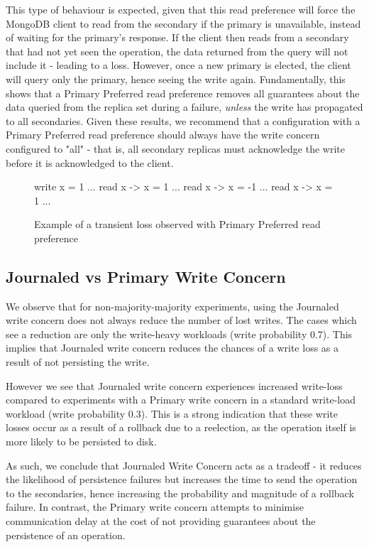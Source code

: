 This type of behaviour is expected, given that this read preference will force the MongoDB client to read from the secondary if the primary is unavailable, instead of waiting for the primary's response. If the client then reads from a secondary that had not yet seen the operation, the data returned from the query will not include it - leading to a loss. However, once a new primary is elected, the client will query only the primary, hence seeing the write again. Fundamentally, this shows that a Primary Preferred read preference removes all guarantees about the data queried from the replica set during a failure, \textit{unless} the write has propagated to all secondaries. Given these results, we recommend that a configuration with a Primary Preferred read preference should always have the write concern configured to "all" - that is, all secondary replicas must acknowledge the write before it is acknowledged to the client.

\begin{figure}
    \begin{CVerbatim}
write x = 1
...
read  x -> x = 1
...
read  x -> x = -1
...
read  x -> x = 1
...
    \end{CVerbatim}
    \label{fig:transitive-loss}
    \caption{Example of a transient loss observed with Primary Preferred read preference}
\end{figure}

\subsection{Journaled vs Primary Write Concern}

We observe that for non-majority-majority experiments, using the Journaled write concern does not always reduce the number of lost writes. The cases which see a reduction are only the write-heavy workloads (write probability 0.7). This implies that Journaled write concern reduces the chances of a write loss as a result of not persisting the write. 

However we see that Journaled write concern experiences increased write-loss compared to experiments with a Primary write concern in a standard write-load workload (write probability 0.3). This is a strong indication that these write losses occur as a result of a rollback due to a reelection, as the operation itself is more likely to be persisted to disk.

As such, we conclude that Journaled Write Concern acts as a tradeoff - it reduces the likelihood of persistence failures but increases the time to send the operation to the secondaries, hence increasing the probability and magnitude of a rollback failure. In contrast, the Primary write concern attempts to minimise communication delay at the cost of not providing guarantees about the persistence of an operation.

